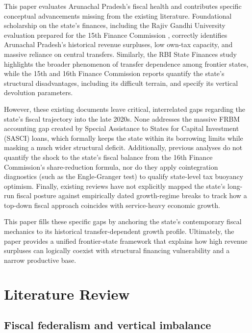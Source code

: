 \documentclass[11pt,a4paper]{article}
\begin{document}
This paper evaluates Arunachal Pradesh's fiscal health and contributes specific conceptual advancements missing from the existing literature. Foundational scholarship on the state's finances, including the Rajiv Gandhi University evaluation prepared for the 15th Finance Commission \citep{nayak_rgu_2019}, correctly identifies Arunachal Pradesh's historical revenue surpluses, low own-tax capacity, and massive reliance on central transfers. Similarly, the RBI State Finances study \citep{rbi_state_finances_2023} highlights the broader phenomenon of transfer dependence among frontier states, while the 15th and 16th Finance Commission reports \citep{fifteenth_fc_2020,sixteenth_fc_2026} quantify the state's structural disadvantages, including its difficult terrain, and specify its vertical devolution parameters.

However, these existing documents leave critical, interrelated gaps regarding the state's fiscal trajectory into the late 2020s. None addresses the massive FRBM accounting gap created by Special Assistance to States for Capital Investment (SASCI) loans, which formally keeps the state within its borrowing limits while masking a much wider structural deficit. Additionally, previous analyses do not quantify the shock to the state's fiscal balance from the 16th Finance Commission's share-reduction formula, nor do they apply cointegration diagnostics (such as the Engle-Granger test) to qualify state-level tax buoyancy optimism. Finally, existing reviews have not explicitly mapped the state's long-run fiscal posture against empirically dated growth-regime breaks to track how a top-down fiscal approach coincides with service-heavy economic growth. 

This paper fills these specific gaps by anchoring the state's contemporary fiscal mechanics to its historical transfer-dependent growth profile. Ultimately, the paper provides a unified frontier-state framework that explains how high revenue surpluses can logically coexist with structural financing vulnerability and a narrow productive base.

\section{Literature Review}

\subsection{Fiscal federalism and vertical imbalance}
\end{document}
